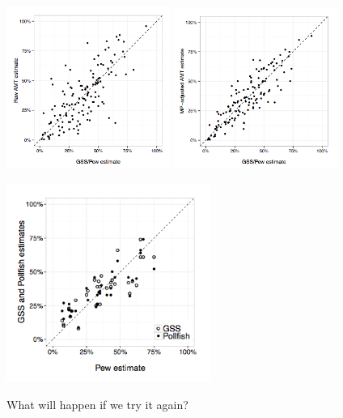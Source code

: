 \documentclass[aspectratio=169]{beamer}
\begin{document}
\begin{frame}

\begin{center}
\includegraphics[width=0.4\textwidth]{figures/goel_non-representative_2016_fig1a}
\includegraphics[width=0.4\textwidth]{figures/goel_non-representative_2016_fig2a}
\end{center}

\end{frame}
\begin{frame}

\begin{center}
\includegraphics[width=0.5\textwidth]{figures/goel_non-representative_2016_fig4}
\end{center}

\end{frame}
\begin{frame}

\Large{
\begin{center}
What will happen if we try it again?
\end{center}
}

\end{frame}
\end{document}
